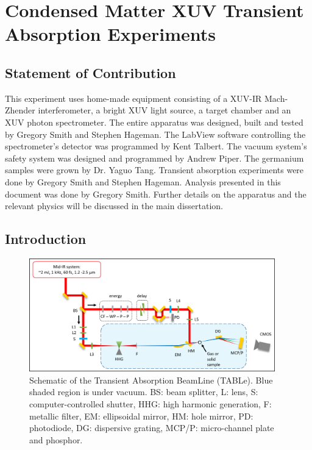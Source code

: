 \chapter{Condensed Matter XUV Transient Absorption Experiments}

\section{Statement of Contribution}
This experiment uses home-made equipment consisting of a XUV-IR Mach-Zhender interferometer, a bright XUV light source, a target chamber and an XUV photon spectrometer. The entire apparatus was designed, built and tested by Gregory Smith and Stephen Hageman. The LabView software controlling the spectrometer's detector was programmed by Kent Talbert. The vacuum system's safety system was designed and programmed by Andrew Piper. The germanium samples were grown by Dr. Yaguo Tang. Transient absorption experiments were done by Gregory Smith and Stephen Hageman. Analysis presented in this document was done by Gregory Smith. Further details on the apparatus and the relevant physics will be discussed in the main dissertation.

\section{Introduction}

\begin{figure}
	\centering
	\includegraphics[width=0.95\textwidth]{figures/chap3/beamline_schematic.png}
	\caption{Schematic of the Transient Absorption BeamLine (TABLe). Blue shaded region is under vacuum. BS: beam splitter, L: lens, S: computer-controlled shutter, HHG: high harmonic generation, F: metallic filter, EM: ellipsoidal mirror, HM: hole mirror, PD: photodiode, DG: dispersive grating, MCP/P: micro-channel plate and phosphor.}
	\label{fig:beamline_schematic}
\end{figure}

